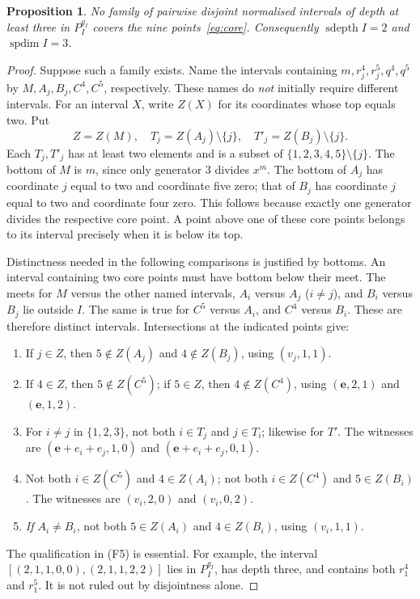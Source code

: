 \documentclass[11pt,a4paper]{article}
\newtheorem{proposition}[theorem]{Proposition}
\theoremstyle{remark}\newtheorem{remark}[theorem]{Remark}
\DeclareMathOperator{\sdepth}{sdepth}
\DeclareMathOperator{\spdim}{spdim}
\newcommand{\e}{\mathbf e}
\begin{document}
\begin{proposition}\label{prop:core}
No family of pairwise disjoint normalised intervals of depth at least three in $P_I^{g_I}$ covers the nine points~\eqref{eq:core}. Consequently $\sdepth I=2$ and $\spdim I=3$.
\end{proposition}
\begin{proof}
Suppose such a family exists. Name the intervals containing $m,r_j^4,r_j^5,q^4,q^5$ by $M,A_j,B_j,C^4,C^5$, respectively. These names do \emph{not} initially require different intervals. For an interval $X$, write $Z(X)$ for its coordinates whose top equals two. Put
\[
Z=Z(M),\quad T_j=Z(A_j)\setminus\{j\},\quad
T'_j=Z(B_j)\setminus\{j\}.
\]
Each $T_j,T'_j$ has at least two elements and is a subset of $\{1,2,3,4,5\}\setminus\{j\}$. The bottom of $M$ is $m$, since only generator 3 divides $x^m$. The bottom of $A_j$ has coordinate $j$ equal to two and coordinate five zero; that of $B_j$ has coordinate $j$ equal to two and coordinate four zero. This follows because exactly one generator divides the respective core point. A point above one of these core points belongs to its interval precisely when it is below its top.

Distinctness needed in the following comparisons is justified by bottoms. An interval containing two core points must have bottom below their meet. The meets for $M$ versus the other named intervals, $A_i$ versus $A_j$ ($i\ne j$), and $B_i$ versus $B_j$ lie outside $I$. The same is true for $C^5$ versus $A_i$, and $C^4$ versus $B_i$. These are therefore distinct intervals. Intersections at the indicated points give:
\begin{enumerate}[label=(F\arabic*),leftmargin=14mm]
\item If $j\in Z$, then $5\notin Z(A_j)$ and $4\notin Z(B_j)$, using $(v_j,1,1)$.
\item If $4\in Z$, then $5\notin Z(C^5)$; if $5\in Z$, then $4\notin Z(C^4)$, using $(\e,2,1)$ and $(\e,1,2)$.
\item For $i\ne j$ in $\{1,2,3\}$, not both $i\in T_j$ and $j\in T_i$; likewise for $T'$. The witnesses are $(\e+e_i+e_j,1,0)$ and $(\e+e_i+e_j,0,1)$.
\item Not both $i\in Z(C^5)$ and $4\in Z(A_i)$; not both $i\in Z(C^4)$ and $5\in Z(B_i)$. The witnesses are $(v_i,2,0)$ and $(v_i,0,2)$.
\item \emph{If $A_i\ne B_i$}, not both $5\in Z(A_i)$ and $4\in Z(B_i)$, using $(v_i,1,1)$.
\end{enumerate}
The qualification in (F5) is essential. For example, the interval $[(2,1,1,0,0),(2,1,1,2,2)]$ lies in $P_I^{g_I}$, has depth three, and contains both $r_1^4$ and $r_1^5$. It is not ruled out by disjointness alone.


\end{proof}
\end{document}
